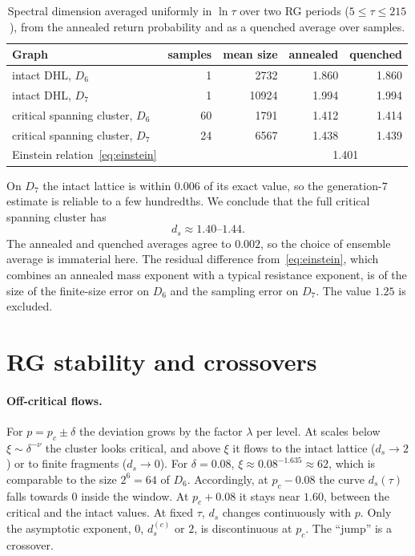 \documentclass[11pt]{article}
\theoremstyle{remark}\newtheorem*{remark}{Remark}
\begin{document}
\begin{table}[ht]
\centering
\caption{Spectral dimension averaged uniformly in $\ln\tau$ over two RG periods ($5\le\tau\le215$), from the annealed
return probability and as a quenched average over samples.}
\label{tab:ds}
\begin{tabular}{lrrrr}
\toprule
Graph & samples & mean size & annealed & quenched \\
\midrule
intact DHL, $D_6$ & 1 & 2732 & 1.860 & 1.860 \\
intact DHL, $D_7$ & 1 & 10924 & 1.994 & 1.994 \\
critical spanning cluster, $D_6$ & 60 & 1791 & 1.412 & 1.414 \\
critical spanning cluster, $D_7$ & 24 & 6567 & 1.438 & 1.439 \\
\midrule
Einstein relation~\eqref{eq:einstein} & & & \multicolumn{2}{c}{1.401} \\
\bottomrule
\end{tabular}
\end{table}

On $D_7$ the intact lattice is within $0.006$ of its exact value, so the generation-$7$ estimate is reliable to a few
hundredths. We conclude that the full critical spanning cluster has
\begin{equation}
d_s\approx1.40\text{--}1.44 .
\end{equation}
The annealed and quenched averages agree to $0.002$, so the choice of ensemble average is immaterial here. The
residual difference from~\eqref{eq:einstein}, which combines an annealed mass exponent with a typical resistance
exponent, is of the size of the finite-size error on $D_6$ and the sampling error on $D_7$. The value $1.25$ is excluded.

\section{RG stability and crossovers}
\label{sec:stability}

\paragraph{Off-critical flows.} For $p=p_c\pm\delta$ the deviation grows by the factor $\lambda$ per level. At scales below
$\xi\sim\delta^{-\nu}$ the cluster looks critical, and above $\xi$ it flows to the intact lattice ($d_s\to2$) or to finite
fragments ($d_s\to0$). For $\delta=0.08$, $\xi\approx0.08^{-1.635}\approx62$, which is comparable to the size $2^6=64$ of $D_6$.
Accordingly, at $p_c-0.08$ the curve $d_s(\tau)$ falls towards $0$ inside the window. At $p_c+0.08$ it stays near $1.60$,
between the critical and the intact values. At fixed $\tau$, $d_s$ changes continuously with $p$. Only the asymptotic
exponent, $0$, $d_s^{(c)}$ or $2$, is discontinuous at $p_c$. The ``jump'' is a crossover.
\end{document}

